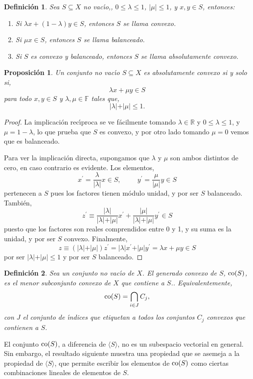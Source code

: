 \documentclass[12pt]{book}
\newtheorem{defn}{\bf Definición}[chapter]
\newtheorem{prop}{\bf Proposición}[chapter]
\begin{document}
\begin{defn} Sea $S\subseteq X$ no vac\'{\i}o,, $0\leq \lambda\leq 1$,  $\vert \mu\vert\leq 1$, y 
$x,y\in S$, entonces:
\begin{enumerate}
\item Si $\lambda x  + (1-\lambda)y\in S$, entonces $S$ se llama convexo.
\item  Si $\mu x\in S$, entonces $S$ se llama balanceado.
\item Si $S$ es convexo y balanceado, entonces $S$ se llama absolutamente convexo.
\end{enumerate}
\end{defn}
\begin{prop} Un conjunto no vac\'{\i}o $S\subseteq X$ es absolutamente convexo si y solo si,
$$ \lambda x  + \mu y \in S$$
para todo $x,y\in S$ y $\lambda,\mu\in\mathbb{F} $ tales que,
$$\vert \lambda\vert +\vert \mu \vert \leq 1.$$
\end{prop}
\begin{proof}
La implicaci\'on rec\'{\i}proca se ve  f\'acilmente tomando $\lambda\in\mathbb{R}$ y 
$0\leq\lambda\leq 1$, y $\mu=1-\lambda$, lo que prueba que $S$  es convexo, y por otro lado 
tomando $\mu=0$ vemos que es balanceado.

 
Para ver la implicaci\'on directa, supongamos que $\lambda$ y $\mu$ son ambos distintos de cero, 
en caso contrario es evidente. Los elementos,
$$x^\prime =\frac{\lambda}{\vert\lambda\vert}x\in S,\hspace{1cm} y^\prime=\frac{\mu}{\vert\mu\vert}
y\in S$$
pertenecen a $S$ pues los factores tienen m\'odulo unidad, y por ser $S$ balanceado. Tambi\'en,
$$z^\prime\equiv \frac{\vert\lambda\vert}{\vert\lambda\vert +\vert\mu\vert} x^\prime + 
\frac{\vert\mu\vert}{\vert\lambda\vert+\vert\mu\vert}y^\prime\in S$$
puesto que los factores son reales comprendidos entre 0 y 1, y su suma es la unidad, y por ser $S$ 
convexo. Finalmente,
$$ z \equiv (\vert\lambda\vert + \vert\mu\vert)z^\prime = \vert\lambda\vert x^\prime + \vert\mu\vert 
y^\prime=\lambda x + \mu y \in S$$
 por ser  $\vert\lambda\vert + \vert\mu\vert\leq 1$ y por ser $S$ balanceado.

\end{proof}

 
 \begin{defn}Sea  un conjunto no vac\'{\i}o de $X$.  El generado convexo de $S$, ${\rm co}(S)$,  es 
el menor  subconjunto convexo  de $X$ que contiene a $S$.. Equivalentemente,
$${\rm co}(S) =\bigcap_{i\in J} C_j,$$
con $J$ el conjunto de \'{\i}ndices que etiquetan a todos los  conjuntos $C_j$ convexos que 
contienen a $S$.
\end{defn}
 El conjunto ${\rm co}(S)$, a diferencia de $\langle S\rangle$, no es un 
subespacio vectorial en general. Sin embargo, el resultado siguiente muestra una propiedad que se 
asemeja a la propiedad de $\langle S\rangle$, que permite escribir los elementos de   ${\rm co}(S)$ 
como ciertas combinaciones lineales de elementos de $S$.
\end{document}
